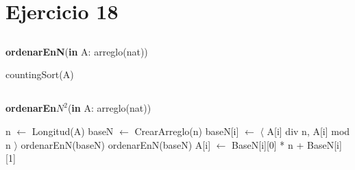 \section{Ejercicio 18}

\subsection{}
\begin{algorithm}[H]
    \caption{
        \textbf{ordenarEnN}(\textbf{in} A: arreglo(nat))
    }
    \begin{algorithmic}[1]
    \State countingSort(A)
    \end{algorithmic}
\end{algorithm}

\subsection{}
\begin{algorithm}[H]
    \caption{
        \textbf{ordenarEn$N^2$}(\textbf{in} A: arreglo(nat))
    }
    \begin{algorithmic}[1]
        \State n $\gets$ Longitud(A)
        \State baseN $\gets$ CrearArreglo(n)
            \State baseN[i] $\gets$ $\langle$ A[i] div n, A[i] mod n $\rangle$
        \EndFor
        \State ordenarEnN(baseN) 
        \State ordenarEnN(baseN) 
            \State A[i] $\gets$ BaseN[i][0] * n + BaseN[i][1]
        \EndFor
    \end{algorithmic}
\end{algorithm}